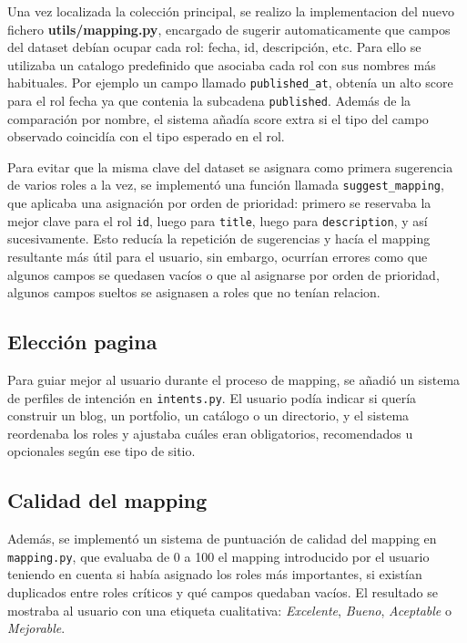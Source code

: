 Una vez localizada la colección principal, se realizo la implementacion del nuevo fichero \textbf{utils/mapping.py}, encargado de sugerir automaticamente que campos
del dataset debían ocupar cada rol: fecha, id, descripción, etc. Para ello se utilizaba un catalogo predefinido que asociaba cada rol con sus nombres más habituales.
Por ejemplo un campo llamado \texttt{published\_at}, obtenía un alto score para el rol fecha ya que contenia la subcadena \texttt{published}.
Además de la comparación por nombre, el sistema añadía score extra si el tipo del campo observado coincidía con el tipo esperado en el rol.

Para evitar que la misma clave del dataset se asignara como primera sugerencia de varios roles a la vez, se implementó una función llamada \texttt{suggest\_mapping}, que aplicaba una asignación por orden de prioridad: primero se reservaba la mejor clave para el rol \texttt{id}, luego para \texttt{title}, luego para \texttt{description}, y así sucesivamente. Esto reducía la repetición de sugerencias y hacía el mapping resultante más útil para el usuario, sin embargo, ocurrían errores como que algunos campos se quedasen vacíos o que al asignarse por orden de prioridad, algunos campos sueltos se asignasen a roles
que no tenían relacion.

\subsection{Elección pagina}
\label{subsec:eleccion-pagina}

Para guiar mejor al usuario durante el proceso de mapping, se añadió un sistema de perfiles de intención en \texttt{intents.py}. El usuario podía indicar si quería construir un blog, un portfolio, un catálogo o un directorio, y el sistema reordenaba los roles y ajustaba cuáles eran obligatorios, recomendados u opcionales según ese tipo de sitio.


\subsection{Calidad del mapping}
\label{subsec:calidad-mapping}
Además, se implementó un sistema de puntuación de calidad del mapping en \texttt{mapping.py}, que evaluaba de 0 a 100 el mapping introducido por el usuario teniendo en cuenta si había asignado los roles más importantes, si existían duplicados entre roles críticos y qué campos quedaban vacíos. El resultado se mostraba al usuario con una etiqueta cualitativa: \emph{Excelente}, \emph{Bueno}, \emph{Aceptable} o \emph{Mejorable}.


